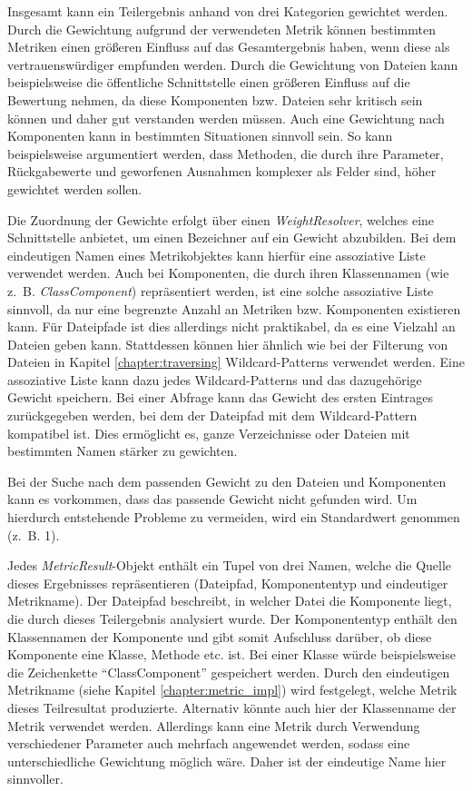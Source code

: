 Insgesamt kann ein Teilergebnis anhand von drei Kategorien gewichtet werden. Durch die Gewichtung aufgrund der verwendeten Metrik können bestimmten Metriken einen größeren Einfluss auf das Gesamtergebnis haben, wenn diese als vertrauenswürdiger empfunden werden. Durch die Gewichtung von Dateien kann beispielsweise die öffentliche Schnittstelle einen größeren Einfluss auf die Bewertung nehmen, da diese Komponenten bzw. Dateien sehr kritisch sein können und daher gut verstanden werden müssen. Auch eine Gewichtung nach Komponenten kann in bestimmten Situationen sinnvoll sein. So kann beispielsweise argumentiert werden, dass Methoden, die durch ihre Parameter, Rückgabewerte und geworfenen Ausnahmen komplexer als Felder sind, höher gewichtet werden sollen.

Die Zuordnung der Gewichte erfolgt über einen \textit{WeightResolver}, welches eine Schnittstelle anbietet, um einen Bezeichner auf ein Gewicht abzubilden. Bei dem eindeutigen Namen eines Metrikobjektes kann hierfür eine assoziative Liste verwendet werden. Auch bei Komponenten, die durch ihren Klassennamen (wie z.~B. \textit{ClassComponent}) repräsentiert werden, ist  eine solche assoziative Liste sinnvoll, da nur eine begrenzte Anzahl an Metriken bzw. Komponenten existieren kann.
Für Dateipfade ist dies allerdings nicht praktikabel, da es eine Vielzahl an Dateien geben kann. Stattdessen können hier ähnlich wie bei der Filterung von Dateien in Kapitel \ref{chapter:traversing} Wildcard-Patterns verwendet werden. Eine assoziative Liste kann dazu jedes Wildcard-Patterns und das dazugehörige Gewicht speichern. Bei einer Abfrage kann das Gewicht des ersten Eintrages zurückgegeben werden, bei dem der Dateipfad mit dem Wildcard-Pattern kompatibel ist. Dies ermöglicht es, ganze Verzeichnisse oder Dateien mit bestimmten Namen stärker zu gewichten. 

Bei der Suche nach dem passenden Gewicht zu den Dateien und Komponenten kann es vorkommen, dass das passende Gewicht nicht gefunden wird. Um hierdurch entstehende Probleme zu vermeiden, wird ein Standardwert genommen (z.~B. 1). 

Jedes \textit{MetricResult}-Objekt enthält ein Tupel von drei Namen, welche die Quelle dieses Ergebnisses repräsentieren (Dateipfad, Komponententyp und eindeutiger Metrikname). Der Dateipfad beschreibt, in welcher Datei die Komponente liegt, die durch dieses Teilergebnis analysiert wurde. Der Komponententyp enthält den Klassennamen der Komponente und gibt somit Aufschluss darüber, ob diese Komponente eine Klasse, Methode etc. ist. Bei einer Klasse würde beispielsweise die Zeichenkette \enquote{ClassComponent} gespeichert werden. Durch den eindeutigen Metrikname (siehe Kapitel \ref{chapter:metric_impl}) wird  festgelegt, welche Metrik dieses Teilresultat produzierte. Alternativ könnte auch hier der Klassenname der Metrik verwendet werden. Allerdings kann eine Metrik durch Verwendung verschiedener Parameter auch mehrfach angewendet werden, sodass eine unterschiedliche Gewichtung möglich wäre. Daher ist der eindeutige Name hier sinnvoller.

